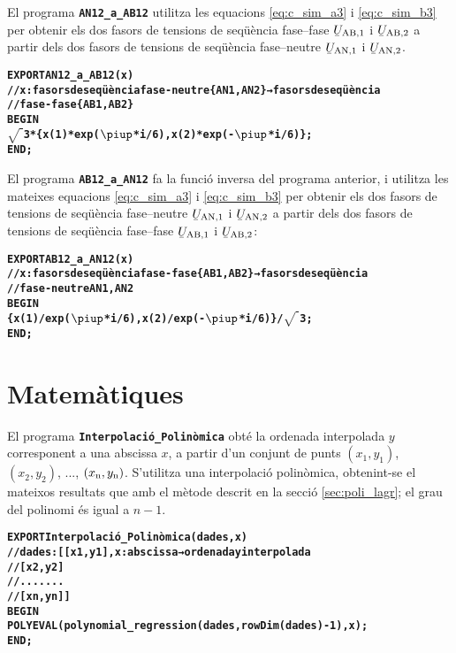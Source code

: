 El programa \texttt{\textbf{AN12\_a\_AB12}} utilitza les equacions  \eqref{eq:c_sim_a3} i \eqref{eq:c_sim_b3} per obtenir els dos fasors de tensions de seqüència fase--fase $\cmplx{U}\ped{AB,1}$ i  $\cmplx{U}\ped{AB,2}$ a partir dels dos fasors de tensions de seqüència fase--neutre $\cmplx{U}\ped{AN,1}$ i $\cmplx{U}\ped{AN,2}$.
\vspace{-6mm}
\begin{alltt}
\bfseries
{}
    EXPORT AN12_a_AB12(x)
    // x:fasors de seqüència fase-neutre \{AN1,AN2\} → fasors de seqüència
    // fase-fase \{AB1,AB2\}
    BEGIN
      \(\sqrt{\phantom{|}}\)3*\{x(1)*exp(\(\piup\)*i/6),x(2)*exp(-\(\piup\)*i/6)\};
    END;
\end{alltt}

El programa \texttt{\textbf{AB12\_a\_AN12}} fa la funció inversa del programa anterior, i utilitza les mateixes equacions  \eqref{eq:c_sim_a3} i \eqref{eq:c_sim_b3} per obtenir els dos fasors de tensions de seqüència fase--neutre $\cmplx{U}\ped{AN,1}$ i $\cmplx{U}\ped{AN,2}$ a partir dels dos fasors de tensions de seqüència fase--fase $\cmplx{U}\ped{AB,1}$ i  $\cmplx{U}\ped{AB,2}$:
\vspace{-6mm}
\begin{alltt}
\bfseries
{}
    EXPORT AB12_a_AN12(x)
    // x:fasors de seqüència fase-fase \{AB1,AB2\} → fasors de seqüència
    // fase-neutre {AN1,AN2}
    BEGIN
      \{x(1)/exp(\(\piup\)*i/6),x(2)/exp(-\(\piup\)*i/6)\}/\(\sqrt{\phantom{|}}\)3;
    END;
\end{alltt}


\section{Matemàtiques}

El programa \texttt{\textbf{Interpolació\_Polinòmica}} obté la ordenada interpolada $y$ corresponent a una abscissa $x$, a partir d'un conjunt  de punts $(x_1,y_1)$, $(x_2,y_2)$, ..., $(x_\mathrm{n},y_\mathrm{n})$. S'utilitza una interpolació polinòmica, obtenint-se el mateixos resultats que amb el mètode descrit en la secció \vref{sec:poli_lagr}; el grau del polinomi és igual a $n-1$.
\vspace{-6mm}
\begin{alltt}
\bfseries
{}
    EXPORT Interpolació_Polinòmica(dades,x)
    // dades:[[x1,y1], x:abscissa → ordenada y interpolada
    //        [x2,y2]
    //        .......
    //        [xn,yn]]
    BEGIN
      POLYEVAL(polynomial_regression(dades,rowDim(dades)-1),x);
    END;
\end{alltt}


